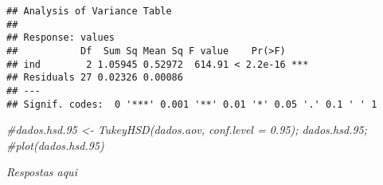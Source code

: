 \documentclass[
]{article}
\newenvironment{Shaded}{\begin{snugshade}}{\end{snugshade}}
\newcommand{\CommentTok}[1]{\textcolor[rgb]{0.56,0.35,0.01}{\textit{#1}}}
\begin{document}
\begin{verbatim}
## Analysis of Variance Table
## 
## Response: values
##           Df  Sum Sq Mean Sq F value    Pr(>F)    
## ind        2 1.05945 0.52972  614.91 < 2.2e-16 ***
## Residuals 27 0.02326 0.00086                      
## ---
## Signif. codes:  0 '***' 0.001 '**' 0.01 '*' 0.05 '.' 0.1 ' ' 1
\end{verbatim}

\begin{Shaded}
\begin{Highlighting}[]
\CommentTok{\#dados.hsd.95 \textless{}{-} TukeyHSD(dados.aov, conf.level = 0.95); dados.hsd.95; }
\CommentTok{\#plot(dados.hsd.95)}
\end{Highlighting}
\end{Shaded}

\emph{Respostas aqui}
\end{document}
